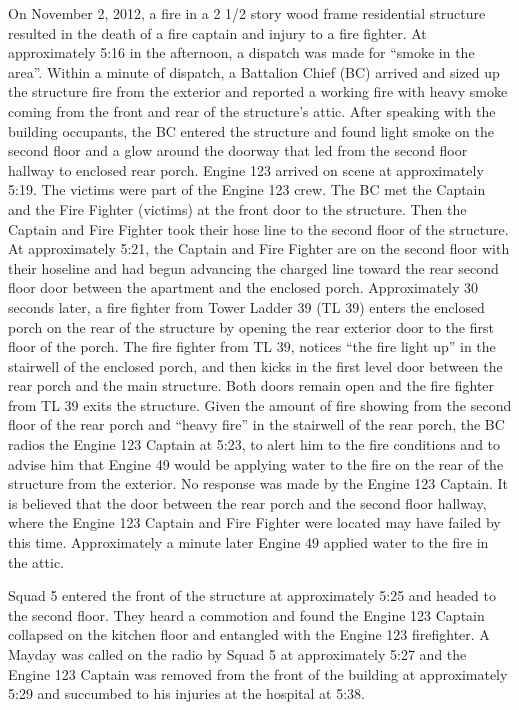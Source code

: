 \documentclass[11pt,oneside]{book}
\begin{document}
On November 2, 2012, a fire in a 2 1/2 story wood frame residential structure resulted in the death of a fire captain and injury to a fire fighter.  At approximately 5:16 in the afternoon, a dispatch was made for ``smoke in the area''.   Within a minute of dispatch, a Battalion Chief (BC) arrived and sized up the structure fire from the exterior and reported a working fire with heavy smoke coming from the front and rear of the structure's attic.  After speaking with the building occupants, the BC entered the structure and found light smoke on the second floor and a glow around the doorway that led from the second floor hallway to enclosed rear porch.  Engine 123 arrived on scene at approximately 5:19. The victims were part of the Engine 123 crew.  The BC met the Captain and the Fire Fighter (victims) at the front door to the structure.  Then the Captain and Fire Fighter took their hose line to the second floor of the structure.  At approximately 5:21, the Captain and Fire Fighter are on the second floor with their hoseline and had begun advancing the charged line toward the rear second floor door between the apartment and the enclosed porch.   Approximately 30 seconds later, a fire fighter from Tower Ladder 39 (TL 39) enters the enclosed porch on the rear of the structure by opening the rear exterior door to the first floor of the porch.   The fire fighter from TL 39, notices ``the fire light up'' in the stairwell of the enclosed porch, and then kicks in the first level door between the rear porch and the main structure.   Both doors remain open and the fire fighter from TL 39 exits the structure.  Given the amount of fire showing from the second floor of the rear porch and ``heavy fire'' in the stairwell of the rear porch, the BC radios the Engine 123 Captain at 5:23, to alert him to the fire conditions and to advise him that Engine 49 would be applying water to the fire on the rear of the structure from the exterior.  No response was made by the Engine 123 Captain.  It is believed that the door between the rear porch and the second floor hallway, where the Engine 123 Captain and Fire Fighter were located may have failed by this time.  Approximately a minute later Engine 49 applied water to the fire in the attic.

Squad 5 entered the front of the structure at approximately 5:25 and headed to the second floor.  They heard a commotion and found the Engine 123 Captain collapsed on the kitchen floor and entangled with the Engine 123 firefighter.  A Mayday was called on the radio by Squad 5 at approximately  5:27 and the Engine 123 Captain was removed from the front of the building at approximately 5:29 and succumbed to his injuries at the hospital at 5:38. 
 
\end{document}
